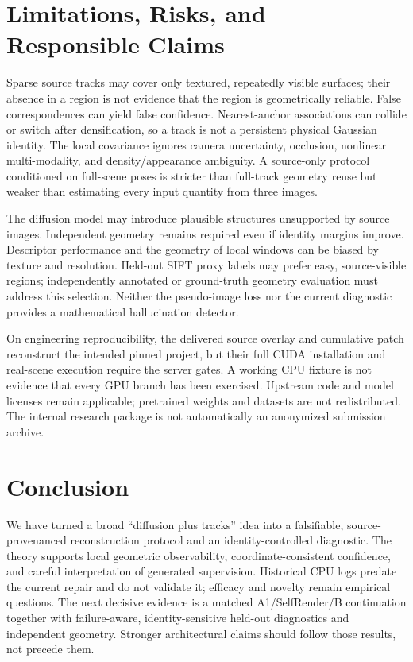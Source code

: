 \documentclass[10pt,twocolumn,letterpaper]{article}
\begin{document}
\section{Limitations, Risks, and Responsible Claims}
Sparse source tracks may cover only textured, repeatedly visible surfaces; their absence in a region is not evidence that the region is geometrically reliable. False correspondences can yield false confidence. Nearest-anchor associations can collide or switch after densification, so a track is not a persistent physical Gaussian identity. The local covariance ignores camera uncertainty, occlusion, nonlinear multi-modality, and density/appearance ambiguity. A source-only protocol conditioned on full-scene poses is stricter than full-track geometry reuse but weaker than estimating every input quantity from three images.

The diffusion model may introduce plausible structures unsupported by source images. Independent geometry remains required even if identity margins improve. Descriptor performance and the geometry of local windows can be biased by texture and resolution. Held-out SIFT proxy labels may prefer easy, source-visible regions; independently annotated or ground-truth geometry evaluation must address this selection. Neither the pseudo-image loss nor the current diagnostic provides a mathematical hallucination detector.

On engineering reproducibility, the delivered source overlay and cumulative patch reconstruct the intended pinned project, but their full CUDA installation and real-scene execution require the server gates. A working CPU fixture is not evidence that every GPU branch has been exercised. Upstream code and model licenses remain applicable; pretrained weights and datasets are not redistributed. The internal research package is not automatically an anonymized submission archive.

\section{Conclusion}
We have turned a broad ``diffusion plus tracks'' idea into a falsifiable, source-provenanced reconstruction protocol and an identity-controlled diagnostic. The theory supports local geometric observability, coordinate-consistent confidence, and careful interpretation of generated supervision. Historical CPU logs predate the current repair and do not validate it; efficacy and novelty remain empirical questions. The next decisive evidence is a matched A1/SelfRender/B continuation together with failure-aware, identity-sensitive held-out diagnostics and independent geometry. Stronger architectural claims should follow those results, not precede them.
\end{document}
